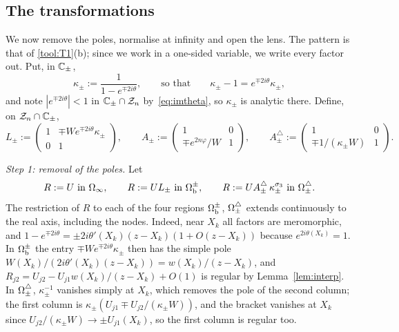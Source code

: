 \subsection{The transformations}\label{sec:frame-transf}
We now remove the poles, normalise at infinity and open the lens. The pattern is that of \ref{tool:T1}(b); since we
work in a one-sided variable, we write every factor out. Put, in $\mathbb{C}_\pm$,
\begin{equation}\label{eq:kappa}
  \kappa_\pm:=\frac1{1-e^{\mp2i\theta}},\qquad\text{so that}\qquad \kappa_\pm-1=e^{\mp2i\theta}\kappa_\pm,
\end{equation}
and note $|e^{\mp2i\theta}|<1$ in $\mathbb{C}_\pm\cap\mathcal{Z}_n$ by~\eqref{eq:imtheta}, so $\kappa_\pm$ is analytic there. Define,
on $\mathcal{Z}_n\cap\mathbb{C}_\pm$,
\begin{equation}\label{eq:LA}
  L_\pm:=\begin{pmatrix}1&\mp We^{\mp2i\theta}\kappa_\pm\\0&1\end{pmatrix},\qquad
  A_\pm:=\begin{pmatrix}1&0\\\mp e^{2n\varphi}/W&1\end{pmatrix},\qquad
  A^\triangle_\pm:=\begin{pmatrix}1&0\\\mp1/(\kappa_\pm W)&1\end{pmatrix}.
\end{equation}

\emph{Step 1: removal of the poles.} Let
\begin{equation}\label{eq:R}
  R:=U\ \text{in }\Omega_{\infty},\qquad R:=UL_\pm\ \text{in }\Omega_{\mathrm{b}}^\pm,\qquad R:=UA^\triangle_\pm\,\kappa_\pm^{\sigma_3}\ \text{in }\Omega^{\triangle}_\pm .
\end{equation}
The restriction of $R$ to each of the four regions $\Omega_{\mathrm{b}}^\pm$, $\Omega^{\triangle}_\pm$ extends continuously to the real axis,
including the nodes. Indeed, near $X_k$ all factors are meromorphic, and $1-e^{\mp2i\theta}=\pm2i\theta'(X_k)
(z-X_k)(1+O(z-X_k))$ because $e^{2i\theta(X_k)}=1$. In $\Omega_{\mathrm{b}}^\pm$ the entry $\mp We^{\mp2i\theta}\kappa_\pm$ then has the
simple pole $W(X_k)/(2i\theta'(X_k)(z-X_k))=w(X_k)/(z-X_k)$, and $R_{j2}=U_{j2}-U_{j1}w(X_k)/(z-X_k)+O(1)$ is regular
by Lemma~\ref{lem:interp}. In $\Omega^{\triangle}_\pm$, $\kappa_\pm^{-1}$ vanishes simply at $X_k$, which removes the pole of the
second column; the first column is $\kappa_\pm(U_{j1}\mp U_{j2}/(\kappa_\pm W))$, and the bracket vanishes at $X_k$
since $U_{j2}/(\kappa_\pm W)\to\pm U_{j1}(X_k)$, so the first column is regular too.


